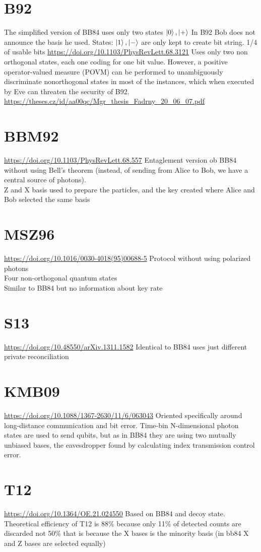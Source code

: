 \documentclass[12pt,a4paper]{article}
\begin{document}
\section{B92}
The simplified version of BB84 uses only two states $\ket{0}, \ket{+}$ In B92 Bob does not announce the basis he used. States: $\ket{1}, \ket{-}$ are only kept to create bit string. 1/4 of usable bits
\url{https://doi.org/10.1103/PhysRevLett.68.3121}
Uses only two non orthogonal states, each one coding for one bit value.
However, a positive operator-valued measure (POVM) can be performed to unambiguously discriminate nonorthogonal states in most of the instances, which when executed by Eve can threaten the security of B92. 
\url{https://theses.cz/id/aa00qc/Mgr_thesis_Fadrny_20_06_07.pdf}
\section{BBM92}
\url{https://doi.org/10.1103/PhysRevLett.68.557}
Entaglement version ob BB84 without using Bell's theorem (instead, of sending from Alice to Bob, we have a central source of photons). \\
Z and X basis used to prepare the particles, and the key created where Alice and Bob selected the same basis
\section{MSZ96}
\url{https://doi.org/10.1016/0030-4018(95)00688-5}
Protocol without using polarized photons\\
Four non-orthogonal quantum states \\ Similar to BB84 but no information about key rate
\section{S13}
\url{https://doi.org/10.48550/arXiv.1311.1582}
Identical to BB84 uses just different private reconciliation
\section{KMB09}
\url{https://doi.org/10.1088/1367-2630/11/6/063043}
Oriented specifically around long-distance communication and bit error.
Time-bin N-dimensional photon states are used to send qubits, but as in BB84 they are using two mutually unbiased bases, the eavesdropper found by calculating index transmission control error.
\section{T12}
\url{https://doi.org/10.1364/OE.21.024550}
Based on BB84 and decoy state. Theoretical efficiency of T12 is 88\% because only 11\% of detected counts are discarded not 50\% that is because the X bases is the minority basis (in bb84 X and Z bases are selected equally)
\end{document}
